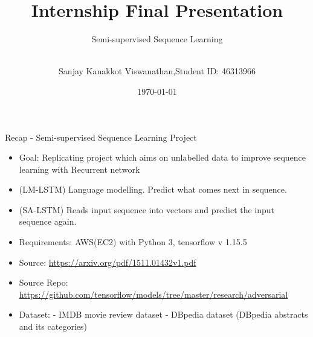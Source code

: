 \documentclass[aspectratio=169,xcolor=dvipsnames]{beamer}
\title[short title]{Internship Final Presentation}
\subtitle{Semi-supervised Sequence Learning}
\author[Sanjay K V] {\\ 
Sanjay Kanakkot Viswanathan\inst{},\break Student ID: 46313966\inst{}}
\institute[NTU] %
{
    Department of Computing, \\
    Macquarie University  
   
    \vskip 3pt
}
\date{\today} %
\begin{document}
\begin{frame}
    \titlepage
\end{frame}

\begin{frame}{Recap - Semi-supervised Sequence Learning Project}
    \tableofcontents
\begin{itemize}
        \item Goal: Replicating project which aims on unlabelled data to improve sequence learning with Recurrent network 
        \item (LM-LSTM) Language modelling. Predict what comes next in sequence. 
        \item (SA-LSTM) Reads input sequence into vectors and predict the input sequence again. 
         \item \alert {Requirements:} AWS(EC2) with Python 3, tensorflow v 1.15.5
     \item \alert{Source:} \href{https://arxiv.org/pdf/1511.01432v1.pdf}{https://arxiv.org/pdf/1511.01432v1.pdf}
    \item \alert{Source Repo:}\href{ https://github.com/tensorflow/models/tree/master/research/adversarial_text}{ https://github.com/tensorflow/models/tree/master/research/adversarial}
    \item Dataset: \break
            - IMDB movie review dataset\break     
            - DBpedia dataset (DBpedia abstracts and its categories)
 
    \end{itemize}

\end{frame}

\end{document}
